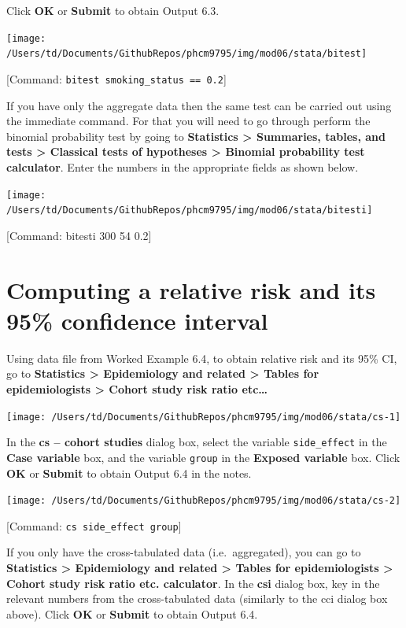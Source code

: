 \documentclass[
]{memoir}
\begin{document}
Click \textbf{OK} or \textbf{Submit} to obtain Output 6.3.

\texttt{[image: /Users/td/Documents/GithubRepos/phcm9795/img/mod06/stata/bitest]}

{[}Command: \texttt{bitest\ smoking\_status\ ==\ 0.2}{]}

If you have only the aggregate data then the same test can be carried out using the immediate command. For that you will need to go through perform the binomial probability test by going to \textbf{Statistics \textgreater{} Summaries, tables, and tests \textgreater{} Classical tests of hypotheses \textgreater{} Binomial probability test calculator}. Enter the numbers in the appropriate fields as shown below.

\texttt{[image: /Users/td/Documents/GithubRepos/phcm9795/img/mod06/stata/bitesti]}

{[}Command: bitesti 300 54 0.2{]}

\hypertarget{computing-a-relative-risk-and-its-95-confidence-interval}{%
\section{Computing a relative risk and its 95\% confidence interval}\label{computing-a-relative-risk-and-its-95-confidence-interval}}

Using data file from Worked Example 6.4, to obtain relative risk and its 95\% CI, go to \textbf{Statistics \textgreater{} Epidemiology and related \textgreater{} Tables for epidemiologists \textgreater{} Cohort study risk ratio etc\ldots{}}

\texttt{[image: /Users/td/Documents/GithubRepos/phcm9795/img/mod06/stata/cs-1]}

In the \textbf{cs -- cohort studies} dialog box, select the variable \texttt{side\_effect} in the \textbf{Case variable} box, and the variable \texttt{group} in the \textbf{Exposed variable} box. Click \textbf{OK} or \textbf{Submit} to obtain Output 6.4 in the notes.

\texttt{[image: /Users/td/Documents/GithubRepos/phcm9795/img/mod06/stata/cs-2]}

{[}Command: \texttt{cs\ side\_effect\ group}{]}

If you only have the cross-tabulated data (i.e.~aggregated), you can go to \textbf{Statistics \textgreater{} Epidemiology and related \textgreater{} Tables for epidemiologists \textgreater{} Cohort study risk ratio etc. calculator}. In the \textbf{csi} dialog box, key in the relevant numbers from the cross-tabulated data (similarly to the cci dialog box above). Click \textbf{OK} or \textbf{Submit} to obtain Output 6.4.
\end{document}

